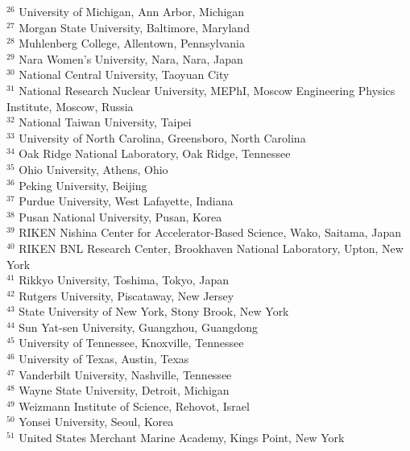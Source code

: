 \documentclass[type=preprint,linenumbering=off]{sphenix}
\begin{document}
\begin{flushleft}
$^{26}$ University of Michigan, Ann Arbor, Michigan\\
$^{27}$ Morgan State University, Baltimore, Maryland\\
$^{28}$ Muhlenberg College, Allentown, Pennsylvania\\
$^{29}$ Nara Women's University, Nara, Nara, Japan\\
$^{30}$ National Central University, Taoyuan City\\
$^{31}$ National Research Nuclear University, MEPhI, Moscow Engineering Physics Institute, Moscow, Russia\\
$^{32}$ National Taiwan University, Taipei\\
$^{33}$ University of North Carolina, Greensboro, North Carolina\\
$^{34}$ Oak Ridge National Laboratory, Oak Ridge, Tennessee\\
$^{35}$ Ohio University, Athens, Ohio\\
$^{36}$ Peking University, Beijing\\
$^{37}$ Purdue University, West Lafayette, Indiana\\
$^{38}$ Pusan National University, Pusan, Korea\\
$^{39}$ RIKEN Nishina Center for Accelerator-Based Science, Wako, Saitama, Japan\\
$^{40}$ RIKEN BNL Research Center, Brookhaven National Laboratory, Upton, New York\\
$^{41}$ Rikkyo University, Toshima, Tokyo, Japan\\
$^{42}$ Rutgers University, Piscataway, New Jersey\\
$^{43}$ State University of New York, Stony Brook, New York\\
$^{44}$ Sun Yat-sen University, Guangzhou, Guangdong\\
$^{45}$ University of Tennessee, Knoxville, Tennessee\\
$^{46}$ University of Texas, Austin, Texas\\
$^{47}$ Vanderbilt University, Nashville, Tennessee\\
$^{48}$ Wayne State University, Detroit, Michigan\\
$^{49}$ Weizmann Institute of Science, Rehovot, Israel\\
$^{50}$ Yonsei University, Seoul, Korea\\
$^{51}$ United States Merchant Marine Academy, Kings Point, New York\\

\end{flushleft}
\end{document}
